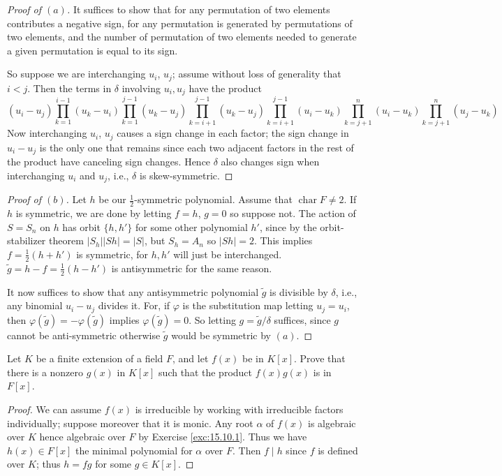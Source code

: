 \documentclass[12pt]{article}
\theoremstyle{remark}
\begin{document}
\begin{proof}[Proof of $(a)$]
  It suffices to show that for any permutation of two elements contributes a negative sign, for any permutation is generated by permutations of two elements, and the number of permutation of two elements needed to generate a given permutation is equal to its sign.
  \par So suppose we are interchanging $u_i$, $u_j$; assume without loss of generality that $i < j$. Then the terms in $\delta$ involving $u_i,u_j$ have the product
  \begin{equation*}
    (u_i-u_j)\prod_{k=1}^{i-1} (u_k-u_i)\prod_{k=1}^{j-1}(u_k - u_j)\prod_{k=i+1}^{j-1}(u_k-u_j)\prod_{k=i+1}^{j-1}(u_i-u_k)\prod_{k=j+1}^n (u_i-u_k)\prod_{k=j+1}^n(u_j-u_k)
  \end{equation*}
  Now interchanging $u_i$, $u_j$ causes a sign change in each factor; the sign change in $u_i-u_j$ is the only one that remains since each two adjacent factors in the rest of the product have canceling sign changes. Hence $\delta$ also changes sign when interchanging $u_i$ and $u_j$, i.e., $\delta$ is skew-symmetric.
\end{proof}
\begin{proof}[Proof of $(b)$]
  Let $h$ be our $\frac{1}{2}$-symmetric polynomial. Assume that $\operatorname{char} F \ne 2$. If $h$ is symmetric, we are done by letting $f=h$, $g=0$ so suppose not. The action of $S = S_n$ on $h$ has orbit $\{h,h'\}$ for some other polynomial $h'$, since by the orbit-stabilizer theorem $\lvert S_h \rvert \lvert Sh \rvert = \lvert S \rvert$, but $S_h = A_n$ so $\lvert Sh\rvert = 2$. This implies $f = \frac{1}{2}(h+h')$ is symmetric, for $h,h'$ will just be interchanged. $\tilde{g} = h - f = \frac{1}{2}(h-h')$ is antisymmetric for the same reason.
  \par It now suffices to show that any antisymmetric polynomial $\tilde{g}$ is divisible by $\delta$, i.e., any binomial $u_i-u_j$ divides it. For, if $\varphi$ is the substitution map letting $u_j = u_i$, then $\varphi(\tilde{g}) = -\varphi(\tilde{g})$ implies $\varphi(\tilde{g}) = 0$. So letting $g = \tilde{g}/\delta$ suffices, since $g$ cannot be anti-symmetric otherwise $\tilde{g}$ would be symmetric by $(a)$.
\end{proof}
\setcounter{subsubsection}{9}
\begin{problem}
  Let $K$ be a finite extension of a field $F$, and let $f(x)$ be in $K[x]$. Prove that there is a nonzero $g(x)$ in $K[x]$ such that the product $f(x)g(x)$ is in $F[x]$.
\end{problem}
\begin{proof}
  We can assume $f(x)$ is irreducible by working with irreducible factors individually; suppose moreover that it is monic. Any root $\alpha$ of $f(x)$ is algebraic over $K$ hence algebraic over $F$ by Exercise \ref{exc:15.10.1}. Thus we have $h(x) \in F[x]$ the minimal polynomial for $\alpha$ over $F$. Then $f \mid h$ since $f$ is defined over $K$; thus $h = fg$ for some $g \in K[x]$.
\end{proof}
\endgroup

\cleardoublepage
{}
{\footnotesize\tableofcontents}
\end{document}
